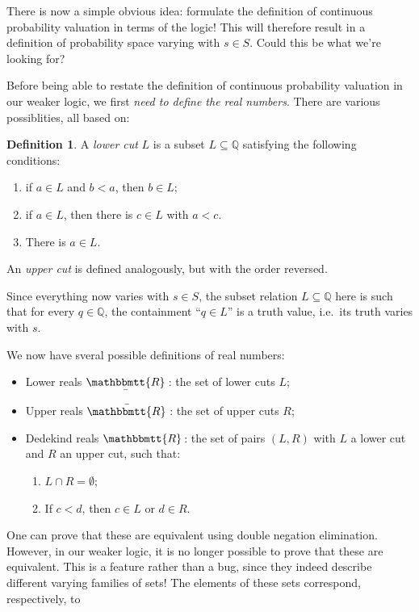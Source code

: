\documentclass[11pt, oneside, article]{memoir}
\theoremstyle{plain}
\theoremstyle{definition}
\newtheorem{definition}[theorem]{Definition}
\theoremstyle{remark}
\newcommand{\ubar}[1]{\underaccent{\bar}{#1}}
\newcommand{\internal}[1]{\raisebox{-.03ex}{$\mathbbmtt{#1}$}}
\newcommand{\hs}{\hspace{1.1pt}}
\newcommand{\tRR}{\internal{R}\hs}
\newcommand{\tLR}{\ubar{\tRR}\hs}
\newcommand{\tUR}{\bar{\tRR}\hs}
\begin{document}
There is now a simple obvious idea: formulate the definition of continuous probability valuation in terms of the logic! This will therefore result in a definition of probability space varying with $s \in S$. Could this be what we're looking for?

Before being able to restate the definition of continuous probability valuation in our weaker logic, we first \emph{need to define the real numbers}. There are various possiblities, all based on:

\newcommand{\Q}{\mathbb{Q}}

\begin{definition}
A \emph{lower cut} $L$ is a subset $L\subseteq\Q$ satisfying the following conditions:
\begin{enumerate}
\item if $a \in L$ and $b < a$, then $b\in L$;
\item if $a \in L$, then there is $c\in L$ with $a < c$.
\item There is $a\in L$.
\end{enumerate}
An \emph{upper cut} is defined analogously, but with the order reversed.
\end{definition}

Since everything now varies with $s\in S$, the subset relation $L \subseteq \Q$ here is such that for every $q\in\Q$, the containment ``$q\in L$'' is a truth value, i.e.~its truth varies with $s$.

We now have sveral possible definitions of real numbers:

\begin{itemize}
\item Lower reals $\tLR$: the set of lower cuts $L$;
\item Upper reals $\tUR$: the set of upper cuts $R$;
\item Dedekind reals $\tRR$: the set of pairs $(L,R)$ with $L$ a lower cut and $R$ an upper cut, such that:
\begin{enumerate}
\item $L \cap R = \emptyset$;
\item If $c < d$, then $c\in L$ or $d\in R$.
\end{enumerate}
\end{itemize}

One can prove that these are equivalent using double negation elimination. However, in our weaker logic, it is no longer possible to prove that these are equivalent. This is a feature rather than a bug, since they indeed describe different varying families of sets! The elements of these sets correspond, respectively, to
\end{document}
